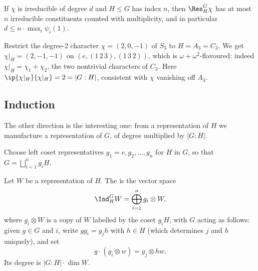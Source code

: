 \begin{corollary}
	If $\chi$ is irreducible of degree $d$ and $H\leq G$ has index $n$, then $\Res^G_H\chi$ has at most $n$ irreducible constituents counted with multiplicity, and in particular $d \leq n\cdot\max_i\psi_i(1)$.
\end{corollary}

\begin{example}
	Restrict the degree-$2$ character $\chi = (2,0,-1)$ of $S_3$ to $H = A_3 = C_3$. We get $\chi|_H = (2,-1,-1)$ on $(e, (1\,2\,3),(1\,3\,2))$, which is $\omega + \omega^2$-flavoured: indeed $\chi|_H = \chi_1 + \chi_2$, the two nontrivial characters of $C_3$. Here $\ip{\chi|_H}{\chi|_H} = 2 = |G:H|$, consistent with $\chi$ vanishing off $A_3$.
\end{example}

\subsection{Induction}

The other direction is the interesting one: from a representation of $H$ we manufacture a representation of $G$, of degree multiplied by $|G:H|$.

Choose left coset representatives $g_1 = e, g_2,\dots,g_n$ for $H$ in $G$, so that $G = \bigsqcup_{i=1}^n g_iH$.

\begin{center}
\end{center}
\vspace{1.4em}

\begin{definition}
	Let $W$ be a representation of $H$. The  is the vector space
	$$\Ind_H^GW = \bigoplus_{i=1}^n g_i\otimes W,$$
	where $g_i\otimes W$ is a copy of $W$ labelled by the coset $g_iH$, with $G$ acting as follows: given $g \in G$ and $i$, write $g g_i = g_j h$ with $h \in H$ (which determines $j$ and $h$ uniquely), and set
	$$g\cdot(g_i\otimes w) = g_j\otimes hw.$$
	Its degree is $|G:H|\cdot\dim W$.
\end{definition}

